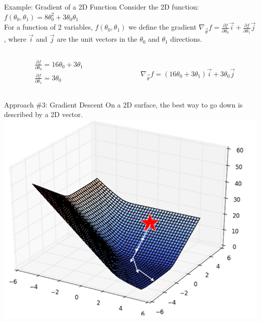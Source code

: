 \documentclass[aspectratio=169]{../latex_main/tntbeamer}  %
\begin{document}
	
	\begin{frame}{Example: Gradient of a 2D Function}
	    Consider the 2D function: $f(\theta_0, \theta_1) = 8\theta_0^2 + 3\theta_0\theta_1$\\
	    \bigskip
	    For a function of 2 variables,     $f(\theta_0, \theta_1)$             we define the gradient           $\nabla_{\Vec{\theta}}f = \frac{\partial f}{\partial\theta_0}\Vec{i} + \frac{\partial f}{\partial\theta_1}\Vec{j} $                         , where  $\Vec{i}$   and  $\Vec{j}$   are the unit vectors in the $\theta_0$ and $\theta_1$ directions.\\
	    
	    \begin{columns}
	        \begin{column}{.5\textwidth}
	            \begin{align*}
	                &\frac{\partial f}{\partial \theta_0} = 16\theta_0 + 3\theta_1\\
	                &\frac{\partial f}{\partial \theta_1} = 3\theta_0
	            \end{align*}
	                
	        \end{column}
	        
	        
	        \begin{column}{.5\textwidth}
	                \\
	                \vspace{.7cm}
	                \begin{equation*}
	                    \nabla_{\Vec{\theta}}f = (16\theta_0 + 3\theta_1)\Vec{i} + 3\theta_0\Vec{j}
	                \end{equation*}
	        \end{column}
	    \end{columns}
	\end{frame}
	
	
	\begin{frame}{Approach \#3: Gradient Descent}
	    On a 2D surface, the best way to go down is described by a 2D vector.\\
	    \centering
	    \includegraphics[scale=.4]{Bild23}
	\end{frame}
	
\end{document}
